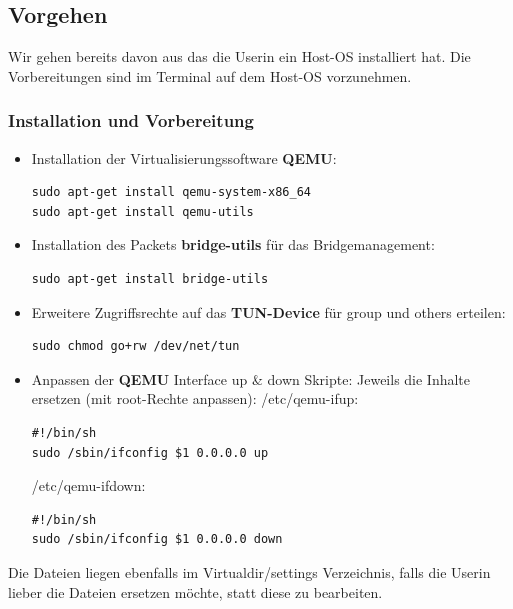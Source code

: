 \documentclass[a4,12pt]{scrartcl}
\begin{document}
\subsection{Vorgehen}
Wir gehen bereits davon aus das die Userin ein Host-OS installiert hat.
Die Vorbereitungen sind im Terminal auf dem Host-OS vorzunehmen. 

\subsubsection{Installation und Vorbereitung}
\begin{itemize}
\item Installation der Virtualisierungssoftware \textbf{QEMU}:
\begin{lstlisting} 
sudo apt-get install qemu-system-x86_64
sudo apt-get install qemu-utils
\end{lstlisting}
\item Installation des Packets \textbf{bridge-utils} für das Bridgemanagement:
\begin{lstlisting}
sudo apt-get install bridge-utils
\end{lstlisting}
\end{itemize} 

\begin{itemize}
\item Erweitere Zugriffsrechte auf das \textbf{TUN-Device} für group und others erteilen:
\begin{lstlisting}
sudo chmod go+rw /dev/net/tun
\end{lstlisting}
\end{itemize}

\begin{itemize}
\item Anpassen der \textbf{QEMU} Interface up \& down Skripte:
\newline
Jeweils die Inhalte ersetzen (mit root-Rechte anpassen):
\newline
/etc/qemu-ifup:
\begin{lstlisting}
#!/bin/sh                                                        
sudo /sbin/ifconfig $1 0.0.0.0 up
\end{lstlisting}
/etc/qemu-ifdown:
\begin{lstlisting}
#!/bin/sh                                                        
sudo /sbin/ifconfig $1 0.0.0.0 down
\end{lstlisting}
\end{itemize}
Die Dateien liegen ebenfalls im Virtualdir/settings Verzeichnis, falls die Userin lieber die Dateien ersetzen möchte, statt diese zu bearbeiten. 
\end{document}

